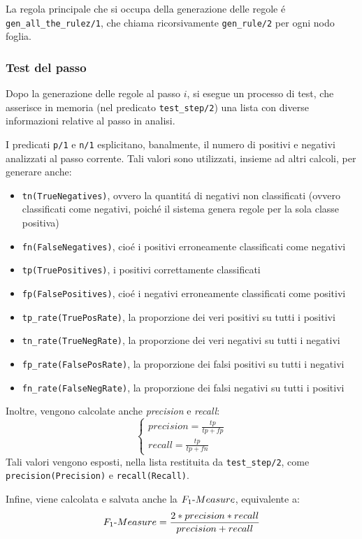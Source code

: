 \documentclass[preprint]{acm_proc_article-sp}
\begin{document}
La regola principale che si occupa della generazione delle regole \'e \verb|gen_all_the_rulez/1|, che chiama ricorsivamente \verb|gen_rule/2| per ogni nodo foglia.

\subsubsection{Test del passo}\label{test-step}
Dopo la generazione delle regole al passo $i$, si esegue un processo di test, che asserisce in memoria (nel predicato \verb|test_step/2|) una lista con diverse informazioni relative al passo in analisi.

I predicati \verb|p/1| e \verb|n/1| esplicitano, banalmente, il numero di positivi e negativi analizzati al passo corrente. Tali valori sono utilizzati, insieme ad altri calcoli, per generare anche:
\begin{itemize}
\item \verb|tn(TrueNegatives)|, ovvero la quantit\'a di negativi non classificati (ovvero classificati come negativi, poich\'e il sistema genera regole per la sola classe positiva)
\item \verb|fn(FalseNegatives)|, cio\'e i positivi erroneamente classificati come negativi
\item \verb|tp(TruePositives)|, i positivi correttamente classificati
\item \verb|fp(FalsePositives)|, cio\'e i negativi erroneamente classificati come positivi
\item \verb|tp_rate(TruePosRate)|, la proporzione dei veri positivi su tutti i positivi
\item \verb|tn_rate(TrueNegRate)|, la proporzione dei veri negativi su tutti i negativi
\item \verb|fp_rate(FalsePosRate)|, la proporzione dei falsi positivi su tutti i negativi
\item \verb|fn_rate(FalseNegRate)|, la proporzione dei falsi negativi su tutti i positivi
\end{itemize}

Inoltre, vengono calcolate anche \textit{precision} e \textit{recall}:
\[
\begin{cases}
precision = \frac{tp}{tp+fp} \\
recall = \frac{tp}{tp+fn}
\end{cases}
\]
Tali valori vengono esposti, nella lista restituita da \verb|test_step/2|, come \verb|precision(Precision)| e \verb|recall(Recall)|.

Infine, viene calcolata e salvata anche la $F_1\textnormal{-}Measure$, equivalente a:
\[ F_1\textnormal{-}Measure = \frac{2*precision*recall}{precision+recall} \]
\end{document}
